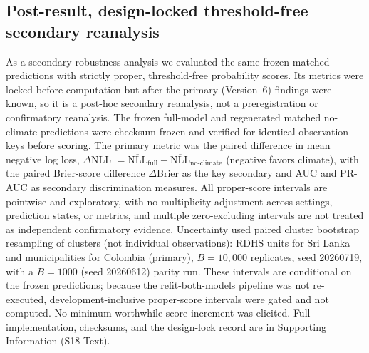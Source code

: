 \documentclass[11pt,a4paper]{article}
\begin{document}
\subsection{Post-result, design-locked threshold-free secondary reanalysis}
As a secondary robustness analysis we evaluated the same frozen matched predictions with strictly proper, threshold-free probability scores. Its metrics were locked before computation but after the primary (Version~6) findings were known, so it is a post-hoc secondary reanalysis, not a preregistration or confirmatory reanalysis. The frozen full-model and regenerated matched no-climate predictions were checksum-frozen and verified for identical observation keys before scoring. The primary metric was the paired difference in mean negative log loss, $\Delta$NLL $=\overline{\mathrm{NLL}}_{\text{full}}-\overline{\mathrm{NLL}}_{\text{no-climate}}$ (negative favors climate), with the paired Brier-score difference $\Delta$Brier as the key secondary and AUC and PR-AUC as secondary discrimination measures. All proper-score intervals are pointwise and exploratory, with no multiplicity adjustment across settings, prediction states, or metrics, and multiple zero-excluding intervals are not treated as independent confirmatory evidence. Uncertainty used paired cluster bootstrap resampling of clusters (not individual observations): RDHS units for Sri Lanka and municipalities for Colombia (primary), $B=10{,}000$ replicates, seed 20260719, with a $B=1000$ (seed 20260612) parity run. These intervals are conditional on the frozen predictions; because the refit-both-models pipeline was not re-executed, development-inclusive proper-score intervals were gated and not computed. No minimum worthwhile score increment was elicited. Full implementation, checksums, and the design-lock record are in Supporting Information (S18 Text).
\end{document}
